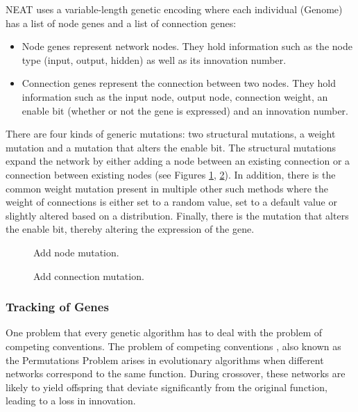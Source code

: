 \documentclass[letterpaper, 12pt]{article}
\begin{document}
NEAT uses a variable-length genetic encoding where each individual (Genome) has a list
of node genes and a list of connection genes:

\begin{itemize}
  \item Node genes represent network nodes. They hold information such as the node type
    (input, output, hidden) as well as its innovation number. 
  \item Connection genes represent the connection between two nodes. They hold
    information such as the input node, output node, connection weight, an enable bit
    (whether or not the gene is expressed) and an innovation number.
\end{itemize}

There are four kinds of generic mutations: two structural mutations, a weight mutation
and a mutation that alters the enable bit. The structural mutations expand the network
by either adding a node between an existing connection or a connection between existing
nodes (see Figures \ref{fig:add_node}, \ref{fig:add_con}). In addition, there is the
common weight mutation present in multiple other such methods where the weight of
connections is either set to a random value, set to a default value or slightly altered
based on a distribution. Finally, there is the mutation that alters the enable bit,
thereby altering the expression of the gene.

\begin{figure}[H]
  \centering
  
  \caption{Add node mutation.}
  \label{fig:add_node}
\end{figure}

\vspace{1cm}

\begin{figure}[H]
  \centering
  
  \caption{Add connection mutation.}
  \label{fig:add_con}
\end{figure}

\subsubsection{Tracking of Genes}
One problem that every genetic algorithm has to deal with the problem of competing
conventions. The problem of competing conventions \cite{schafwhit}, also known as the
Permutations Problem \cite{Radcliffe1993GeneticSR} arises in evolutionary algorithms
when different networks correspond to the same function. During crossover, these
networks are likely to yield offspring that deviate significantly from the original
function, leading to a loss in innovation.
\end{document}
